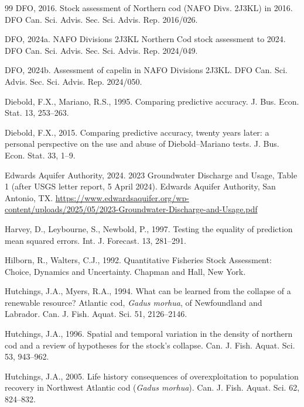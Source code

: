 \documentclass[preprint,11pt,authoryear]{elsarticle}
\theoremstyle{definition}
\theoremstyle{remark}
\begin{document}
\begin{thebibliography}{99}
DFO, 2016. Stock assessment of Northern cod (NAFO Divs. 2J3KL) in 2016. DFO Can. Sci. Advis. Sec. Sci. Advis. Rep. 2016/026.

DFO, 2024a. NAFO Divisions 2J3KL Northern Cod stock assessment to 2024. DFO Can. Sci. Advis. Sec. Sci. Advis. Rep. 2024/049.

DFO, 2024b. Assessment of capelin in NAFO Divisions 2J3KL. DFO Can. Sci. Advis. Sec. Sci. Advis. Rep. 2024/050.

Diebold, F.X., Mariano, R.S., 1995. Comparing predictive accuracy. J. Bus. Econ. Stat. 13, 253--263.

Diebold, F.X., 2015. Comparing predictive accuracy, twenty years later: a personal perspective on the use and abuse of Diebold--Mariano tests. J. Bus. Econ. Stat. 33, 1--9.

Edwards Aquifer Authority, 2024. 2023 Groundwater Discharge and Usage, Table 1 (after USGS letter report, 5 April 2024). Edwards Aquifer Authority, San Antonio, TX. \url{https://www.edwardsaquifer.org/wp-content/uploads/2025/05/2023-Groundwater-Discharge-and-Usage.pdf}

Harvey, D., Leybourne, S., Newbold, P., 1997. Testing the equality of prediction mean squared errors. Int. J. Forecast. 13, 281--291.

Hilborn, R., Walters, C.J., 1992. Quantitative Fisheries Stock Assessment: Choice, Dynamics and Uncertainty. Chapman and Hall, New York.

Hutchings, J.A., Myers, R.A., 1994. What can be learned from the collapse of a renewable resource? Atlantic cod, \emph{Gadus morhua}, of Newfoundland and Labrador. Can. J. Fish. Aquat. Sci. 51, 2126--2146.

Hutchings, J.A., 1996. Spatial and temporal variation in the density of northern cod and a review of hypotheses for the stock's collapse. Can. J. Fish. Aquat. Sci. 53, 943--962.

Hutchings, J.A., 2005. Life history consequences of overexploitation to population recovery in Northwest Atlantic cod (\emph{Gadus morhua}). Can. J. Fish. Aquat. Sci. 62, 824--832.


\end{thebibliography}
\end{document}
